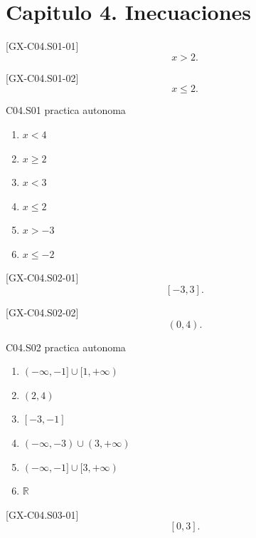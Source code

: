 \section*{Capitulo 4. Inecuaciones}

\begin{shortanswer}{[GX-C04.S01-01]}
\[
x>2.
\]
\end{shortanswer}

\begin{shortanswer}{[GX-C04.S01-02]}
\[
x\leq 2.
\]
\end{shortanswer}

\begin{shortanswer}{C04.S01 practica autonoma}
\begin{enumerate}[label=\textbf{PX-C04.S01-\arabic*:}, leftmargin=*]
  \item \(x<4\)
  \item \(x\geq 2\)
  \item \(x<3\)
  \item \(x\leq 2\)
  \item \(x>-3\)
  \item \(x\leq -2\)
\end{enumerate}
\end{shortanswer}

\begin{shortanswer}{[GX-C04.S02-01]}
\[
[-3,3].
\]
\end{shortanswer}

\begin{shortanswer}{[GX-C04.S02-02]}
\[
(0,4).
\]
\end{shortanswer}

\begin{shortanswer}{C04.S02 practica autonoma}
\begin{enumerate}[label=\textbf{PX-C04.S02-\arabic*:}, leftmargin=*]
  \item \((-\infty,-1]\cup [1,+\infty)\)
  \item \((2,4)\)
  \item \([-3,-1]\)
  \item \((-\infty,-3)\cup (3,+\infty)\)
  \item \((-\infty,-1]\cup [3,+\infty)\)
  \item \(\mathbb{R}\)
\end{enumerate}
\end{shortanswer}

\begin{shortanswer}{[GX-C04.S03-01]}
\[
[0,3].
\]
\end{shortanswer}


